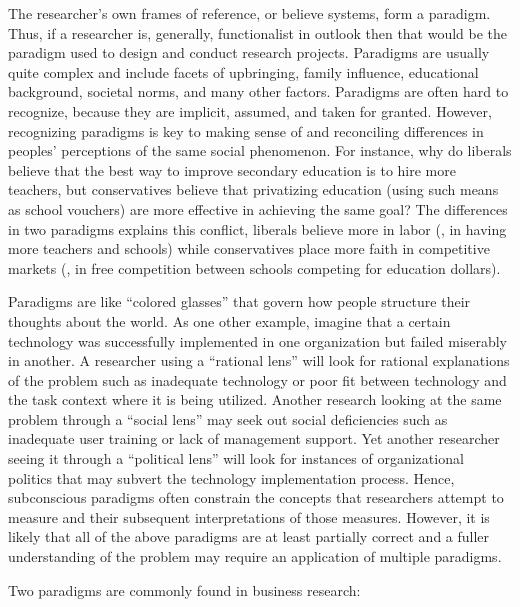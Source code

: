 The researcher's own frames of reference, or believe systems, form a paradigm. Thus, if a researcher is, generally, functionalist in outlook then that would be the paradigm used to design and conduct research projects. Paradigms are usually quite complex and include facets of upbringing, family influence, educational background, societal norms, and many other factors. Paradigms are often hard to recognize, because they are implicit, assumed, and taken for granted. However, recognizing paradigms is key to making sense of and reconciling differences in peoples' perceptions of the same social phenomenon. For instance, why do liberals believe that the best way to improve secondary education is to hire more teachers, but conservatives believe that privatizing education (using such means as school vouchers) are more effective in achieving the same goal? The differences in two paradigms explains this conflict, liberals believe more in labor (\ie, in having more teachers and schools) while conservatives place more faith in competitive markets (\ie, in free competition between schools competing for education dollars). 

Paradigms are like ``colored glasses'' that govern how people structure their thoughts about the world. As one other example, imagine that a certain technology was successfully implemented in one organization but failed miserably in another. A researcher using a ``rational lens'' will look for rational explanations of the problem such as inadequate technology or poor fit between technology and the task context where it is being utilized. Another research looking at the same problem through a ``social lens'' may seek out social deficiencies such as inadequate user training or lack of management support. Yet another researcher seeing it through a ``political lens'' will look for instances of organizational politics that may subvert the technology implementation process. Hence, subconscious paradigms often constrain the concepts that researchers attempt to measure and their subsequent interpretations of those measures. However, it is likely that all of the above paradigms are at least partially correct and a fuller understanding of the problem may require an application of multiple paradigms.

Two paradigms are commonly found in business research:

